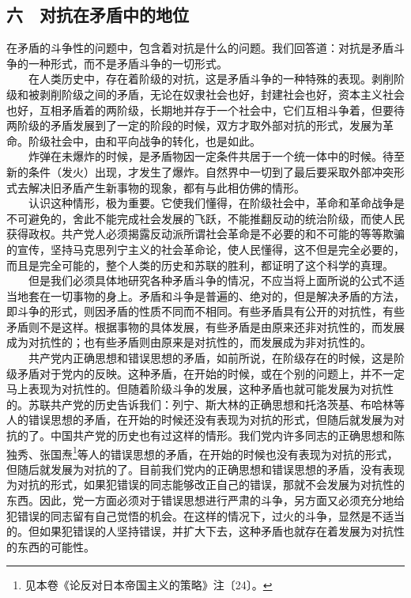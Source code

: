 \documentclass[cn,11pt,chinese]{elegantbook}
\def\myformat#1{\hfil\hfil #1}
\begin{document}
\subsection*{\myformat{六　对抗在矛盾中的地位}}
在矛盾的斗争性的问题中，包含着对抗是什么的问题。我们回答道：对抗是矛盾斗争的一种形式，而不是矛盾斗争的一切形式。\\
　　在人类历史中，存在着阶级的对抗，这是矛盾斗争的一种特殊的表现。剥削阶级和被剥削阶级之间的矛盾，无论在奴隶社会也好，封建社会也好，资本主义社会也好，互相矛盾着的两阶级，长期地并存于一个社会中，它们互相斗争着，但要待两阶级的矛盾发展到了一定的阶段的时候，双方才取外部对抗的形式，发展为革命。阶级社会中，由和平向战争的转化，也是如此。\\
　　炸弹在未爆炸的时候，是矛盾物因一定条件共居于一个统一体中的时候。待至新的条件（发火）出现，才发生了爆炸。自然界中一切到了最后要采取外部冲突形式去解决旧矛盾产生新事物的现象，都有与此相仿佛的情形。\\
　　认识这种情形，极为重要。它使我们懂得，在阶级社会中，革命和革命战争是不可避免的，舍此不能完成社会发展的飞跃，不能推翻反动的统治阶级，而使人民获得政权。共产党人必须揭露反动派所谓社会革命是不必要的和不可能的等等欺骗的宣传，坚持马克思列宁主义的社会革命论，使人民懂得，这不但是完全必要的，而且是完全可能的，整个人类的历史和苏联的胜利，都证明了这个科学的真理。\\
　　但是我们必须具体地研究各种矛盾斗争的情况，不应当将上面所说的公式不适当地套在一切事物的身上。矛盾和斗争是普遍的、绝对的，但是解决矛盾的方法，即斗争的形式，则因矛盾的性质不同而不相同。有些矛盾具有公开的对抗性，有些矛盾则不是这样。根据事物的具体发展，有些矛盾是由原来还非对抗性的，而发展成为对抗性的；也有些矛盾则由原来是对抗性的，而发展成为非对抗性的。\\
　　共产党内正确思想和错误思想的矛盾，如前所说，在阶级存在的时候，这是阶级矛盾对于党内的反映。这种矛盾，在开始的时候，或在个别的问题上，并不一定马上表现为对抗性的。但随着阶级斗争的发展，这种矛盾也就可能发展为对抗性的。苏联共产党的历史告诉我们：列宁、斯大林的正确思想和托洛茨基、布哈林等人的错误思想的矛盾，在开始的时候还没有表现为对抗的形式，但随后就发展为对抗的了。中国共产党的历史也有过这样的情形。我们党内许多同志的正确思想和陈独秀、张国焘\footnote[36]{ 见本卷《论反对日本帝国主义的策略》注〔24〕。}等人的错误思想的矛盾，在开始的时候也没有表现为对抗的形式，但随后就发展为对抗的了。目前我们党内的正确思想和错误思想的矛盾，没有表现为对抗的形式，如果犯错误的同志能够改正自己的错误，那就不会发展为对抗性的东西。因此，党一方面必须对于错误思想进行严肃的斗争，另方面又必须充分地给犯错误的同志留有自己觉悟的机会。在这样的情况下，过火的斗争，显然是不适当的。但如果犯错误的人坚持错误，并扩大下去，这种矛盾也就存在着发展为对抗性的东西的可能性。\\
\end{document}
